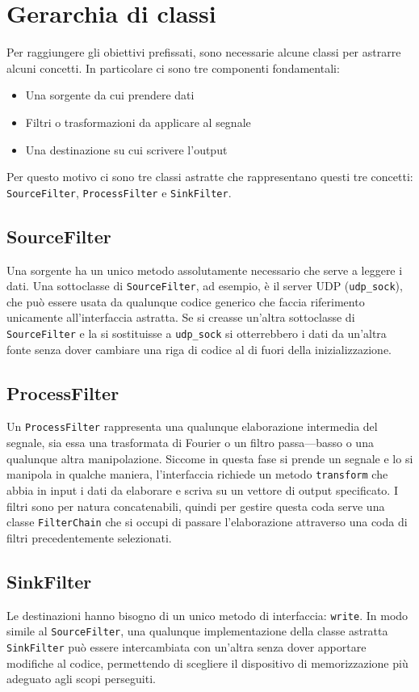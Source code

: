 \section{Gerarchia di classi}
Per raggiungere gli obiettivi prefissati, sono necessarie alcune classi per
astrarre alcuni concetti. In particolare ci sono tre componenti fondamentali:
\begin{itemize}
\item Una sorgente da cui prendere dati
\item Filtri o trasformazioni da applicare al segnale
\item Una destinazione su cui scrivere l'output
\end{itemize}
Per questo motivo ci sono tre classi astratte che rappresentano questi tre
concetti: \texttt{SourceFilter}, \texttt{ProcessFilter} e \texttt{SinkFilter}.
\subsection{SourceFilter}
Una sorgente ha un unico metodo assolutamente necessario che serve a leggere i
dati. Una sottoclasse di \texttt{SourceFilter}, ad esempio, \`e il server UDP
(\texttt{udp\_sock}), che pu\`o essere usata da qualunque codice generico che
faccia riferimento unicamente all'interfaccia astratta. Se si creasse un'altra
sottoclasse di \texttt{SourceFilter} e la si sostituisse a \texttt{udp\_sock} si
otterrebbero i dati da un'altra fonte senza dover cambiare una riga di codice al
di fuori della inizializzazione.
\subsection{ProcessFilter}
Un \texttt{ProcessFilter} rappresenta una qualunque elaborazione intermedia del
segnale, sia essa una trasformata di Fourier o un filtro passa---basso o una
qualunque altra manipolazione. Siccome in questa fase si prende un segnale e lo
si manipola in qualche maniera, l'interfaccia richiede un metodo
\texttt{transform} che abbia in input i dati da elaborare e scriva su un vettore
di output specificato. I filtri sono per natura concatenabili, quindi per
gestire questa coda serve una classe \texttt{FilterChain} che si occupi di
passare l'elaborazione attraverso una coda di filtri precedentemente
selezionati.
\subsection{SinkFilter}
Le destinazioni hanno bisogno di un unico metodo di interfaccia: \texttt{write}.
In modo simile al \texttt{SourceFilter}, una qualunque implementazione della
classe astratta \texttt{SinkFilter} pu\`o essere intercambiata con un'altra
senza dover apportare modifiche al codice, permettendo di scegliere il
dispositivo di memorizzazione pi\`u adeguato agli scopi perseguiti.
